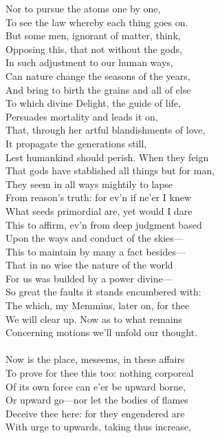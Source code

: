 Nor to pursue the atoms one by one,\\
To see the law whereby each thing goes on.\\
But some men, ignorant of matter, think,\\
Opposing this, that not without the gods,\\
In such adjustment to our human ways,\\
Can nature change the seasons of the years,\\
And bring to birth the grains and all of else\\
To which divine Delight, the guide of life,\\
Persuades mortality and leads it on,\\
That, through her artful blandishments of love,\\
It propagate the generations still,\\
Lest humankind should perish. When they feign\\
That gods have stablished all things but for man,\\
They seem in all ways mightily to lapse\\
From reason's truth: for ev'n if ne'er I knew\\
What seeds primordial are, yet would I dare\\
This to affirm, ev'n from deep judgment based\\
Upon the ways and conduct of the skies—\\
This to maintain by many a fact besides—\\
That in no wise the nature of the world\\
For us was builded by a power divine—\\
So great the faults it stands encumbered with:\\
The which, my Memmius, later on, for thee\\
We will clear up. Now as to what remains\\
Concerning motions we'll unfold our thought.\\
\\
Now is the place, meseems, in these affairs\\
To prove for thee this too: nothing corporeal\\
Of its own force can e'er be upward borne,\\
Or upward go—nor let the bodies of flames\\
Deceive thee here: for they engendered are\\
With urge to upwards, taking thus increase,\\
